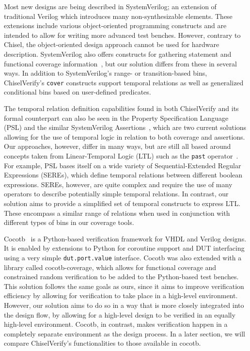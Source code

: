\documentclass[conference]{IEEEtran}
\begin{document}
Most new designs are being described in SystemVerilog; an extension of traditional Verilog 
which introduces many non-synthesizable elements. These extensions include various object-oriented 
programming constructs and are intended to allow for writing more advanced test benches. However, 
contrary to Chisel, the object-oriented design approach cannot be used for hardware 
description. SystemVerilog also offers constructs for gathering statement and functional 
coverage information~\cite{spear2008systemverilog}, but our solution differs from these in 
several ways. In addition to SystemVerilog's range- or transition-based bins, 
ChiselVerify's \texttt{cover} constructs support temporal relations as well as generalized 
conditional bins based on user-defined predicates. 

The temporal relation definition capabilities found in both ChiselVerify and its formal counterpart can also be seen in the Property Specification Language (PSL) and the similar SystemVerilog Assertions~\cite{Boule2008}, which are two current solutions allowing for the use of temporal logic in relation to both coverage and assertions. 
Our approaches, however, differ in many ways, but are still all based around concepts taken from Linear-Temporal Logic (LTL) such as the \texttt{past} operator~\cite{Dax2010:temporal-logics}.
For example, PSL bases itself on a wide variety of Sequential-Extended Regular Expressions (SEREs), which define temporal relations between different boolean expressions.
SEREs, however, are quite complex and require the use of many operators to describe potentially simple temporal relations. 
In contrast, our solution aims to provide a simplified set of temporal constructs to express LTL.
These encompass a similar range of relations when used in conjunction with different types of bins in our coverage tools.

Cocotb~\cite{cocotb:2018} is a Python-based verification framework for VHDL and Verilog designs.
It is enabled by extensions to Python for coroutine support and DUT interfacing using a very simple \texttt{dut.port.value} interface.
Cocotb was also extended with a library called cocotb-coverage, which allows for functional coverage and constrained random verification to be added to the Python-based test benches.
This solution follows the same goals as ours, since it aims to improve verification efficiency by allowing for verification to take place in a high-level environment.
However, our solution aims to do so in a way that is more closely integrated into the design flow, by allowing for a high-level design to be verified in an equally high-level environment.
Cocotb, in contrast, makes verification happen in a completely separate environment as the design process. 
In a later section, we will compare ChiselVerify's functionalities to those available in cocotb.
\end{document}
